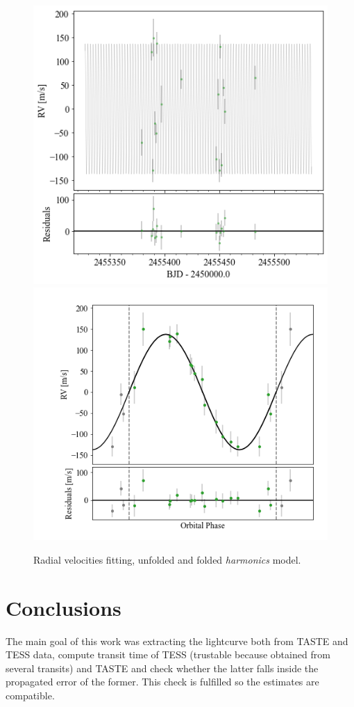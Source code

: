 \documentclass[a4paper,11pt,twocolumn]{article}
\begin{document}
\begin{figure}[H]
	\centering
	\includegraphics[scale=0.4, angle=0]{../pictures/RV/RV2_unfolded.png}
	\includegraphics[scale=0.4, angle=0]{../pictures/RV/RV2.png}
	\caption{Radial velocities fitting, unfolded and folded \textit{harmonics} model.}
	\label{fig:RV2}
\end{figure}




\newpage

\section{Conclusions}
The main goal of this work was extracting the lightcurve both from TASTE
and TESS data, compute transit time of TESS (trustable because obtained 
from several transits) and TASTE and check whether the latter falls inside 
the propagated error of the former. This check is fulfilled so the estimates 
are compatible.
\end{document}
